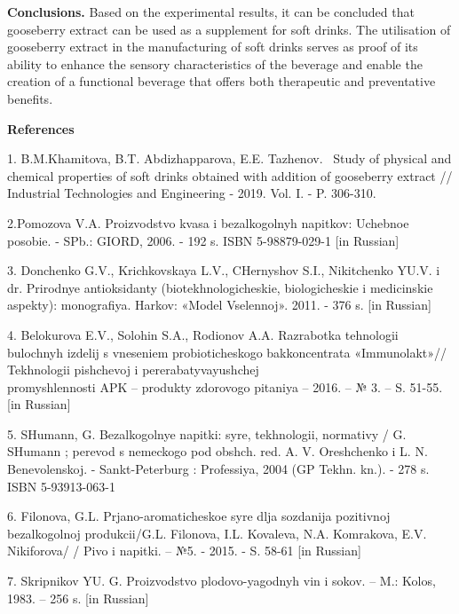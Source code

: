 {\bfseries Conclusions.} Based on the experimental results, it can be
concluded that gooseberry extract can be used as a supplement for soft
drinks. The utilisation of gooseberry extract in the manufacturing of
soft drinks serves as proof of its ability to enhance the sensory
characteristics of the beverage and enable the creation of a functional
beverage that offers both therapeutic and preventative benefits.



\begin{center}
  {\bfseries References}
  \end{center}
  
  \begin{noparindent}

1. B.M.Khamitova, B.T. Abdizhapparova, E.E. Tazhenov.~ Study of physical
and chemical properties of soft drinks obtained with addition of
gooseberry extract // Industrial Technologies and Engineering - 2019.
Vol. I. - P. 306-310.

2.Pomozova V.A. Proizvodstvo kvasa i bezalkogol\textquotesingle nyh
napitkov: Uchebnoe posobie. - SPb.: GIORD, 2006. - 192 s. ISBN
5-98879-029-1 {[}in Russian{]}

3. Donchenko G.V., Krichkovskaya L.V., CHernyshov S.I., Nikitchenko
YU.V. i dr. Prirodnye antioksidanty (biotekhnologicheskie,
biologicheskie i medicinskie aspekty): monografiya.
Har\textquotesingle kov: «Model\textquotesingle{} Vselennoj». 2011. -
376 s. {[}in Russian{]}

4. Belokurova E.V., Solohin S.A., Rodionov A.A. Razrabotka tehnologii
bulochnyh izdelij s vneseniem probioticheskogo bakkoncentrata
«Immunolakt»// Tekhnologii pishchevoj i pererabatyvayushchej
\\promyshlennosti APK -- produkty zdorovogo pitaniya -- 2016. -- № 3. --
S. 51-55. {[}in Russian{]}

5. SHumann, G. Bezalkogol\textquotesingle nye napitki:
syr\textquotesingle e, tekhnologii, normativy / G. SHumann ; perevod s
nemeckogo pod obshch. red. A. V. Oreshchenko i L. N. Benevolenskoj. -
Sankt-Peterburg : Professiya, 2004 (GP Tekhn. kn.). - 278 s. ISBN
5-93913-063-1

6. Filonova, G.L. Prjano-aromaticheskoe
syr\textquotesingle\textquotesingle e dlja sozdanija pozitivnoj
bezalkogol\textquotesingle\textquotesingle noj produkcii/G.L. Filonova,
I.L. Kovaleva, N.A. Komrakova, E.V. Nikiforova/ / Pivo i napitki. -- №5.
- 2015. - S. 58-61 {[}in Russian{]}

7. Skripnikov YU. G. Proizvodstvo plodovo-yagodnyh vin i sokov. -- M.:
Kolos, 1983. -- 256 s. {[}in Russian{]}


\end{noparindent}
